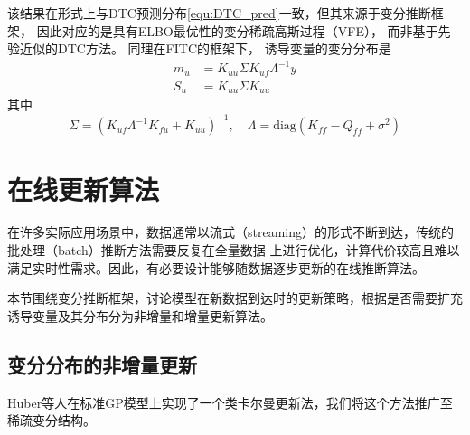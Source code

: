 该结果在形式上与DTC预测分布\autoref{equ:DTC_pred}一致，但其来源于变分推断框架，
因此对应的是具有ELBO最优性的变分稀疏高斯过程（VFE），
而非基于先验近似的DTC方法。
同理在FITC的框架下，
诱导变量的变分分布是
\begin{equation}
    \begin{aligned}
        m_u &= K_{uu} \Sigma K_{uf} \Lambda^{-1} y \\
        S_u &= K_{uu} \Sigma K_{uu}
    \end{aligned}
\end{equation}
其中
\begin{equation}
    \Sigma = (K_{uf} \Lambda^{-1} K_{fu} + K_{uu})^{-1}, \quad \Lambda = \text{diag}(K_{ff} - Q_{ff} + \sigma^2)
\end{equation}

\section{在线更新算法}

在许多实际应用场景中，数据通常以流式（streaming）的形式不断到达，传统的批处理（batch）推断方法需要反复在全量数据
上进行优化，计算代价较高且难以满足实时性需求。因此，有必要设计能够随数据逐步更新的在线推断算法。

本节围绕变分推断框架，讨论模型在新数据到达时的更新策略，根据是否需要扩充诱导变量及其分布分为非增量和增量更新算法。

\subsection{变分分布的非增量更新}

Huber等人\cite{Huber_2014}在标准GP模型上实现了一个类卡尔曼更新法，我们将这个方法推广至稀疏变分结构。

